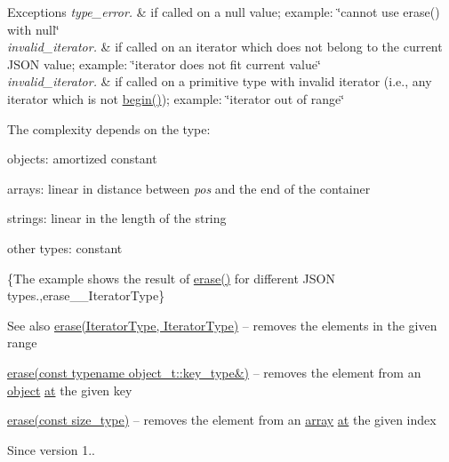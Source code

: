 \begin{DoxyExceptions}{Exceptions}
{\em type\+\_\+error.} & if called on a {\ttfamily null} value; example\+: {\ttfamily \char`\"{}cannot use
erase() with null\char`\"{}} \\
\hline
{\em invalid\+\_\+iterator.} & if called on an iterator which does not belong to the current J\+S\+ON value; example\+: {\ttfamily \char`\"{}iterator does not fit current
value\char`\"{}} \\
\hline
{\em invalid\+\_\+iterator.} & if called on a primitive type with invalid iterator (i.\+e., any iterator which is not {\ttfamily \hyperlink{classnlohmann_1_1basic__json_a0ff28dac23f2bdecee9564d07f51dcdc}{begin()}}); example\+: {\ttfamily \char`\"{}iterator
out of range\char`\"{}}\\
\hline
\end{DoxyExceptions}
The complexity depends on the type\+:
\begin{DoxyItemize}
\item objects\+: amortized constant
\item arrays\+: linear in distance between {\itshape pos} and the end of the container
\item strings\+: linear in the length of the string
\item other types\+: constant
\end{DoxyItemize}

\{The example shows the result of {\ttfamily \hyperlink{classnlohmann_1_1basic__json_a068a16e76be178e83da6a192916923ed}{erase()}} for different J\+S\+ON types.,erase\+\_\+\+\_\+\+Iterator\+Type\}

\begin{DoxySeeAlso}{See also}
\hyperlink{classnlohmann_1_1basic__json_a4b3f7eb2d4625d95a51fbbdceb7c5f39}{erase(\+Iterator\+Type, Iterator\+Type)} -- removes the elements in the given range 

\hyperlink{classnlohmann_1_1basic__json_a2f8484d69c55d8f2a9697a7bec29362a}{erase(const typename object\+\_\+t\+::key\+\_\+type\&)} -- removes the element from an \hyperlink{classnlohmann_1_1basic__json_aa13f7c0615867542ce80337cbcf13ada}{object} \hyperlink{classnlohmann_1_1basic__json_a73ae333487310e3302135189ce8ff5d8}{at} the given key 

\hyperlink{classnlohmann_1_1basic__json_a88cbcefe9a3f4d294bed0653550a5cb9}{erase(const size\+\_\+type)} -- removes the element from an \hyperlink{classnlohmann_1_1basic__json_aa80485befaffcadaa39965494e0b4d2e}{array} \hyperlink{classnlohmann_1_1basic__json_a73ae333487310e3302135189ce8ff5d8}{at} the given index
\end{DoxySeeAlso}
\begin{DoxySince}{Since}
version 1.. 
\end{DoxySince}


